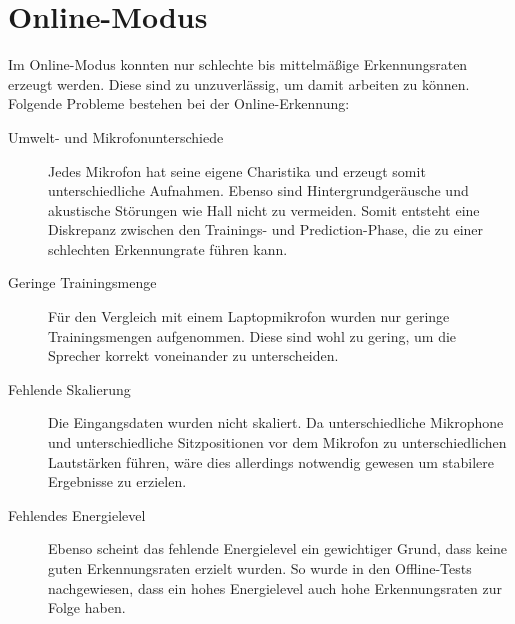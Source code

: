 \section{Online-Modus}
Im Online-Modus konnten nur schlechte bis mittelmäßige Erkennungsraten erzeugt werden. Diese sind zu unzuverlässig, um damit arbeiten zu können. Folgende Probleme bestehen bei der Online-Erkennung:
\begin{description}
	\item[Umwelt- und Mikrofonunterschiede] Jedes Mikrofon hat seine eigene Charistika und erzeugt somit unterschiedliche Aufnahmen. Ebenso sind Hintergrundgeräusche und akustische Störungen wie Hall nicht zu vermeiden. Somit entsteht eine Diskrepanz zwischen den Trainings- und Prediction-Phase, die zu einer schlechten Erkennungrate führen kann.
	\item[Geringe Trainingsmenge] Für den Vergleich mit einem Laptopmikrofon wurden nur geringe Trainingsmengen aufgenommen. Diese sind wohl zu gering, um die Sprecher korrekt voneinander zu unterscheiden.
	\item[Fehlende Skalierung] Die Eingangsdaten wurden nicht skaliert. Da unterschiedliche Mikrophone und unterschiedliche Sitzpositionen vor dem Mikrofon zu unterschiedlichen Lautstärken führen, wäre dies allerdings notwendig gewesen um stabilere Ergebnisse zu erzielen.
	\item[Fehlendes Energielevel] Ebenso scheint das fehlende Energielevel ein gewichtiger Grund, dass keine guten Erkennungsraten erzielt wurden. So wurde in den Offline-Tests nachgewiesen, dass ein hohes Energielevel auch hohe Erkennungsraten zur Folge haben.
\end{description}
